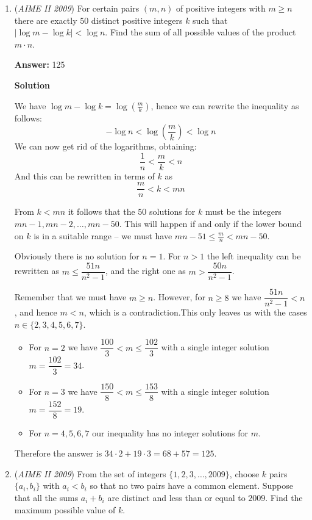 \begin{enumerate}
	\item (\textit{AIME II 2009}) For certain pairs $(m,n)$ of positive integers with $m\geq n$ there are exactly $50$ distinct positive integers $k$ such that $|\log m - \log k| < \log n$. Find the sum of all possible values of the product $m \cdot n$.


 
 \textbf{Answer: }125



\textbf{Solution}

We have $\log m - \log k = \log \left( \frac mk \right)$, hence we can rewrite the inequality as follows:
 \[- \log n < \log \left( \frac mk \right) < \log n\]We can now get rid of the logarithms, obtaining:
 \[\frac 1n < \frac mk < n\]And this can be rewritten in terms of $k$ as
 \[\frac mn < k < mn\]

 From $k<mn$ it follows that the $50$ solutions for $k$ must be the integers $mn-1, mn-2, \dots, mn-50$. This will happen if and only if the lower bound on $k$ is in a suitable range -- we must have $mn-51 \leq \frac mn < mn-50$.

 Obviously there is no solution for $n=1$. For $n>1$ the left inequality can be rewritten as $m\leq\dfrac{51n}{n^2-1}$, and the right one as $m > \dfrac{50n}{n^2-1}$.

 Remember that we must have $m\geq n$. However, for $n\geq 8$ we have $\dfrac{51n}{n^2-1} < n$, and hence $m<n$, which is a contradiction.This only leaves us with the cases $n\in\{2,3,4,5,6,7\}$.

 
            \begin{itemize}
        \item For $n=2$ we have $\dfrac{100}3 < m \leq \dfrac{102}3$ with a single integer solution $m=\dfrac{102}3=34$.
        \item For $n=3$ we have $\dfrac{150}8 < m \leq \dfrac{153}8$ with a single integer solution $m=\dfrac{152}8=19$.
        \item For $n=4,5,6,7$ our inequality has no integer solutions for $m$.
            \end{itemize}
            Therefore the answer is $34\cdot 2 + 19\cdot 3 = 68 + 57 = \boxed{125}$.

 


	\item (\textit{AIME II 2009}) From the set of integers $\{1,2,3,\dots,2009\}$, choose $k$ pairs $\{a_i,b_i\}$ with $a_i<b_i$ so that no two pairs have a common element. Suppose that all the sums $a_i+b_i$ are distinct and less than or equal to $2009$. Find the maximum possible value of $k$.



\end{enumerate}
